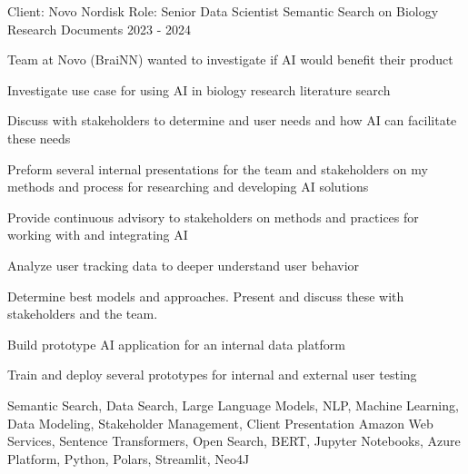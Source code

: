 \begin{cventries}
\cventry
{Client: Novo Nordisk \newline Role: Senior Data Scientist} %
{Semantic Search on Biology Research Documents} %
{}%
{2023 - 2024} %
{ %
\begin{cvitems}
\item {Team at Novo (BraiNN) wanted to investigate if AI would benefit their product}
\item {Investigate use case for using AI in biology research literature search}
\item {Discuss with stakeholders to determine and user needs and how AI can facilitate these needs}
\item {Preform several internal presentations for the team and stakeholders on my methods and process for researching and developing AI solutions}
\item {Provide continuous advisory to stakeholders on methods and practices for working with and integrating AI}
\item {Analyze user tracking data to deeper understand user behavior}
\item {Determine best models and approaches. Present and discuss these with stakeholders and the team.}
\item {Build prototype AI application for an internal data platform}
\item {Train and deploy several prototypes for internal and external user testing}
\end{cvitems}
\cventrykeywords
{Semantic Search, Data Search, Large Language Models, NLP, Machine Learning, Data Modeling, Stakeholder Management, Client Presentation}
{Amazon Web Services, Sentence Transformers, Open Search, BERT, Jupyter Notebooks, Azure Platform, Python, Polars, Streamlit, Neo4J}
}


\end{cventries}
